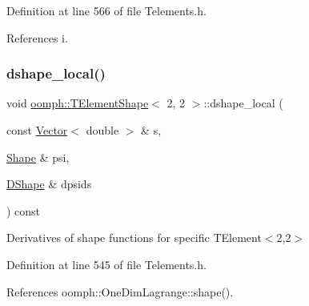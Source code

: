 Definition at line 566 of file Telements.\+h.



References i.

\mbox{\label{classoomph_1_1TElementShape_3_012_00_012_01_4_aaeb1b437fff56c08eaa5d949ebbc557e}} 
\subsubsection{\texorpdfstring{dshape\+\_\+local()}{dshape\_local()}}
{\footnotesize\ttfamily void \hyperlink{classoomph_1_1TElementShape}{oomph\+::\+T\+Element\+Shape}$<$ 2, 2 $>$\+::dshape\+\_\+local (\begin{DoxyParamCaption}\item[{const \hyperlink{classoomph_1_1Vector}{Vector}$<$ double $>$ \&}]{s,  }\item[{\hyperlink{classoomph_1_1Shape}{Shape} \&}]{psi,  }\item[{\hyperlink{classoomph_1_1DShape}{D\+Shape} \&}]{dpsids }\end{DoxyParamCaption}) const\hspace{0.3cm}{\ttfamily [inline]}}



Derivatives of shape functions for specific T\+Element$<$2,2$>$ 



Definition at line 545 of file Telements.\+h.



References oomph\+::\+One\+Dim\+Lagrange\+::shape().

\mbox{\label{classoomph_1_1TElementShape_3_012_00_012_01_4_a7271df560302bad7f91c997e13495fab}} 
